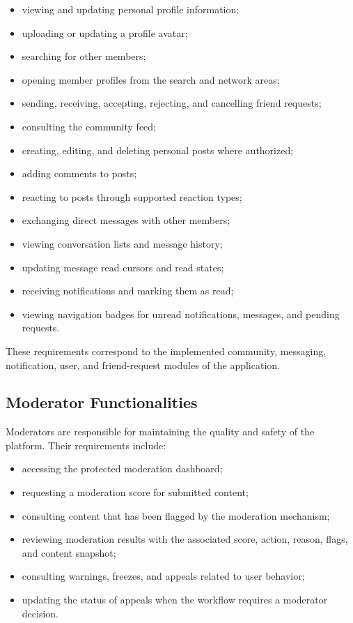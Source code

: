 \begin{itemize}
    \item viewing and updating personal profile information;
    \item uploading or updating a profile avatar;
    \item searching for other members;
    \item opening member profiles from the search and network areas;
    \item sending, receiving, accepting, rejecting, and cancelling friend requests;
    \item consulting the community feed;
    \item creating, editing, and deleting personal posts where authorized;
    \item adding comments to posts;
    \item reacting to posts through supported reaction types;
    \item exchanging direct messages with other members;
    \item viewing conversation lists and message history;
    \item updating message read cursors and read states;
    \item receiving notifications and marking them as read;
    \item viewing navigation badges for unread notifications, messages, and pending requests.
\end{itemize}

These requirements correspond to the implemented community, messaging, notification, user, and friend-request modules of the application.

\subsection{Moderator Functionalities}

Moderators are responsible for maintaining the quality and safety of the platform. Their requirements include:

\begin{itemize}
    \item accessing the protected moderation dashboard;
    \item requesting a moderation score for submitted content;
    \item consulting content that has been flagged by the moderation mechanism;
    \item reviewing moderation results with the associated score, action, reason, flags, and content snapshot;
    \item consulting warnings, freezes, and appeals related to user behavior;
    \item updating the status of appeals when the workflow requires a moderator decision.
\end{itemize}

